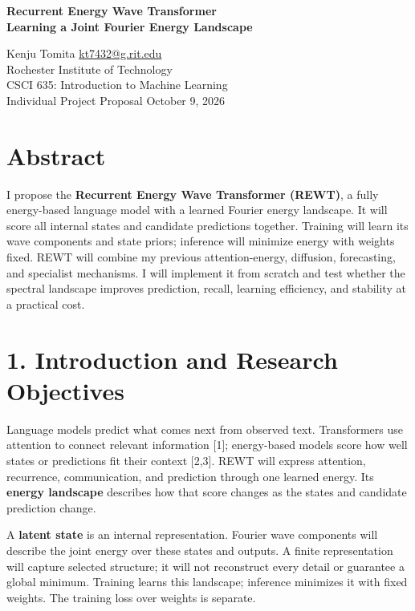 \documentclass[11pt,letterpaper]{article}
\begin{document}
\begin{center}
{\Large\bfseries Recurrent Energy Wave Transformer\\Learning a Joint Fourier Energy Landscape}\par
\vspace{3pt}
Kenju Tomita \quad \href{mailto:kt7432@g.rit.edu}{kt7432@g.rit.edu}\\
Rochester Institute of Technology\\
CSCI 635: Introduction to Machine Learning\\
Individual Project Proposal \quad October 9, 2026
\end{center}

\section*{Abstract}

I propose the \textbf{Recurrent Energy Wave Transformer (REWT)}, a fully energy-based language model with a learned Fourier energy landscape. It will score all internal states and candidate predictions together. Training will learn its wave components and state priors; inference will minimize energy with weights fixed. REWT will combine my previous attention-energy, diffusion, forecasting, and specialist mechanisms. I will implement it from scratch and test whether the spectral landscape improves prediction, recall, learning efficiency, and stability at a practical cost.

\section*{1. Introduction and Research Objectives}

Language models predict what comes next from observed text. Transformers use attention to connect relevant information [1]; energy-based models score how well states or predictions fit their context [2,3]. REWT will express attention, recurrence, communication, and prediction through one learned energy. Its \textbf{energy landscape} describes how that score changes as the states and candidate prediction change.

A \textbf{latent state} is an internal representation. Fourier wave components will describe the joint energy over these states and outputs. A finite representation will capture selected structure; it will not reconstruct every detail or guarantee a global minimum. Training learns this landscape; inference minimizes it with fixed weights. The training loss over weights is separate.
\end{document}
